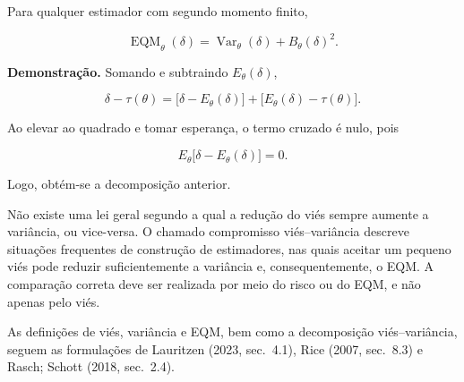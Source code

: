 \documentclass[
  letterpaper,
  DIV=11,
  numbers=noendperiod]{scrreprt}
\begin{document}
\begin{tcolorbox}[enhanced jigsaw, colback=white, leftrule=.75mm, colbacktitle=quarto-callout-important-color!10!white, breakable, titlerule=0mm, bottomtitle=1mm, title=\textcolor{quarto-callout-important-color}{\faExclamation}\hspace{0.5em}{Decomposição viés--variância}, colframe=quarto-callout-important-color-frame, toprule=.15mm, opacityback=0, bottomrule=.15mm, opacitybacktitle=0.6, arc=.35mm, toptitle=1mm, rightrule=.15mm, coltitle=black, left=2mm]

Para qualquer estimador com segundo momento finito,

\[\operatorname{EQM}_\theta(\delta)
=
\operatorname{Var}_\theta(\delta)
+
B_\theta(\delta)^2.\]

\end{tcolorbox}

\textbf{Demonstração.} Somando e subtraindo \(E_\theta(\delta)\),

\[\delta-\tau(\theta)
=
\bigl[\delta-E_\theta(\delta)\bigr]
+
\bigl[E_\theta(\delta)-\tau(\theta)\bigr].\]

Ao elevar ao quadrado e tomar esperança, o termo cruzado é nulo, pois

\[E_\theta\bigl[\delta-E_\theta(\delta)\bigr]=0.\]

Logo, obtém-se a decomposição anterior.

\begin{tcolorbox}[enhanced jigsaw, colback=white, leftrule=.75mm, colbacktitle=quarto-callout-warning-color!10!white, breakable, titlerule=0mm, bottomtitle=1mm, title=\textcolor{quarto-callout-warning-color}{\faExclamationTriangle}\hspace{0.5em}{Observação --- Compromisso entre viés e variância}, colframe=quarto-callout-warning-color-frame, toprule=.15mm, opacityback=0, bottomrule=.15mm, opacitybacktitle=0.6, arc=.35mm, toptitle=1mm, rightrule=.15mm, coltitle=black, left=2mm]

Não existe uma lei geral segundo a qual a redução do viés sempre aumente
a variância, ou vice-versa. O chamado compromisso viés--variância
descreve situações frequentes de construção de estimadores, nas quais
aceitar um pequeno viés pode reduzir suficientemente a variância e,
consequentemente, o EQM. A comparação correta deve ser realizada por
meio do risco ou do EQM, e não apenas pelo viés.

\end{tcolorbox}

As definições de viés, variância e EQM, bem como a decomposição
viés--variância, seguem as formulações de Lauritzen (2023, sec.~4.1),
Rice (2007, sec.~8.3) e Rasch; Schott (2018, sec.~2.4).
\end{document}
